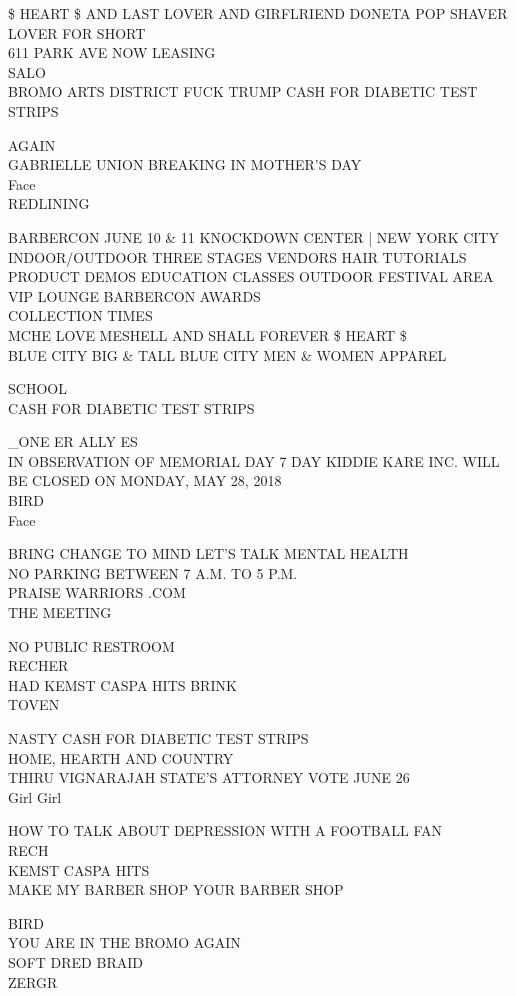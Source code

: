 \documentclass[10pt,letterpaper]{article}
\begin{document}
\$ HEART \$ AND LAST LOVER AND GIRFLRIEND DONETA POP SHAVER LOVER FOR SHORT\\
611 PARK AVE NOW LEASING\\
SALO\\
BROMO ARTS DISTRICT FUCK TRUMP CASH FOR DIABETIC TEST STRIPS

AGAIN\\
GABRIELLE UNION BREAKING IN MOTHER'S DAY\\
Face\\
REDLINING

BARBERCON JUNE 10 \& 11 KNOCKDOWN CENTER | NEW YORK CITY INDOOR/OUTDOOR THREE STAGES VENDORS HAIR TUTORIALS PRODUCT DEMOS EDUCATION CLASSES OUTDOOR FESTIVAL AREA VIP LOUNGE BARBERCON AWARDS\\
COLLECTION TIMES\\
MCHE LOVE MESHELL AND SHALL FOREVER \$ HEART \$\\
BLUE CITY BIG \& TALL BLUE CITY MEN \& WOMEN APPAREL

SCHOOL\\
CASH FOR DIABETIC TEST STRIPS

\_ONE ER ALLY ES\\
IN OBSERVATION OF MEMORIAL DAY 7 DAY KIDDIE KARE INC. WILL BE CLOSED ON MONDAY, MAY 28, 2018\\
BIRD\\
Face

BRING CHANGE TO MIND LET'S TALK MENTAL HEALTH\\
NO PARKING BETWEEN 7 A.M. TO 5 P.M.\\
PRAISE WARRIORS .COM\\
THE MEETING

NO PUBLIC RESTROOM\\
RECHER\\
HAD KEMST CASPA HITS BRINK\\
TOVEN

NASTY CASH FOR DIABETIC TEST STRIPS\\
HOME, HEARTH AND COUNTRY\\
THIRU VIGNARAJAH STATE'S ATTORNEY VOTE JUNE 26\\
Girl Girl

HOW TO TALK ABOUT DEPRESSION WITH A FOOTBALL FAN\\
RECH\\
KEMST CASPA HITS\\
MAKE MY BARBER SHOP YOUR BARBER SHOP

BIRD\\
YOU ARE IN THE BROMO AGAIN\\
SOFT DRED BRAID\\
ZERGR
\end{document}
